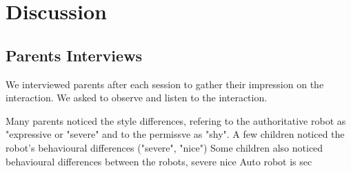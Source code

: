 \documentclass[a4paper,twocolumn]{svjour3}
\begin{document}
%



\section{Discussion}

\subsection{Parents Interviews}
We interviewed parents after each session to gather their impression on the interaction. We asked to observe and listen to the interaction.

Many parents noticed the style differences, refering to the authoritative robot as "expressive or "severe" and to the permissve as "shy". 
A few children noticed the robot's behavioural differences ("severe", "nice")
Some children also noticed behavioural differences between the robots, severe nice 
Auto robot is sec 
\end{document}
